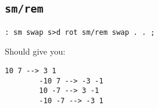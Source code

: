 \subsection{\texttt{sm/rem}}

\begin{lstlisting}[frame=lines]
        : sm swap s>d rot sm/rem swap . . ; 
\end{lstlisting}

\noindent Should give you: 
\begin{lstlisting}[frame=lines]
        10 7 --> 3 1
        -10 7 --> -3 -1 
        10 -7 --> 3 -1
        -10 -7 --> -3 1
\end{lstlisting}
